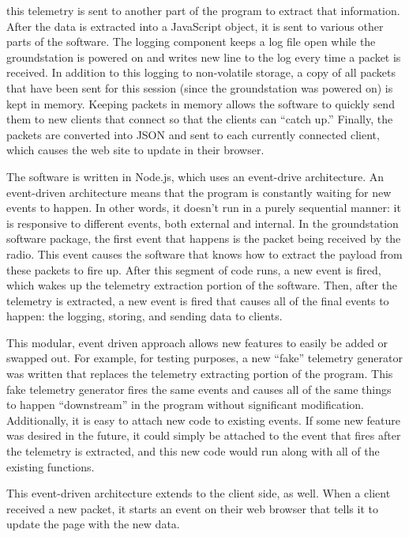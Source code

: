 \documentclass[10pt,draftclsnofoot,onecolumn]{IEEEtran}
\begin{document}
this telemetry is sent to another part of the program to extract that information.
After the data is extracted into a JavaScript object, it is sent to various other parts of the software.
The logging component keeps a log file open while the groundstation is powered on and writes new line to the log every time a packet is received.
In addition to this logging to non-volatile storage, a copy of all packets that have been sent for this session (since the groundstation was powered on) is kept in memory.
Keeping packets in memory allows the software to quickly send them to new clients that connect so that the clients can ``catch up.''
Finally, the packets are converted into JSON and sent to each currently connected client, which causes the web site to update in their browser.

The software is written in Node.js, which uses an event-drive architecture.
An event-driven architecture means that the program is constantly waiting for new events to happen.
In other words, it doesn't run in a purely sequential manner: it is responsive to different events, both external and internal.
In the groundstation software package, the first event that happens is the packet being received by the radio.
This event causes the software that knows how to extract the payload from these packets to fire up.
After this segment of code runs, a new event is fired, which wakes up the telemetry extraction portion of the software.
Then, after the telemetry is extracted, a new event is fired that causes all of the final events to happen: the logging, storing, and sending data to clients.

This modular, event driven approach allows new features to easily be added or swapped out.
For example, for testing purposes, a new ``fake'' telemetry generator was written that replaces the telemetry extracting portion of the program.
This fake telemetry generator fires the same events and causes all of the same things to happen ``downstream'' in the program without significant modification.
Additionally, it is easy to attach new code to existing events.
If some new feature was desired in the future, it could simply be attached to the event that fires after the telemetry is extracted,
and this new code would run along with all of the existing functions.

This event-driven architecture extends to the client side, as well.
When a client received a new packet, it starts an event on their web browser that tells it to update the page with the new data.
\end{document}
